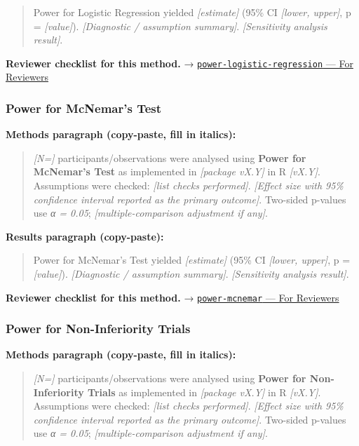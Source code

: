 \documentclass[
]{article}
\begin{document}
\begin{quote}
Power for Logistic Regression yielded \emph{{[}estimate{]}} (95\% CI
\emph{{[}lower, upper{]}}, p = \emph{{[}value{]}}). \emph{{[}Diagnostic
/ assumption summary{]}}. \emph{{[}Sensitivity analysis result{]}}.
\end{quote}

\textbf{Reviewer checklist for this method.} →
\href{../chapters/05-power/power-logistic-regression.Rmd\#for-reviewers}{\texttt{power-logistic-regression}
--- For Reviewers}

\subsubsection{Power for McNemar's Test}\label{power-for-mcnemars-test}

\textbf{Methods paragraph (copy-paste, fill in italics):}

\begin{quote}
\emph{{[}N={]}} participants/observations were analysed using
\textbf{Power for McNemar's Test} as implemented in \emph{{[}package
vX.Y{]}} in R \emph{{[}vX.Y{]}}. Assumptions were checked: \emph{{[}list
checks performed{]}}. \emph{{[}Effect size with 95\% confidence interval
reported as the primary outcome{]}}. Two-sided p-values use \emph{α =
0.05}; \emph{{[}multiple-comparison adjustment if any{]}}.
\end{quote}

\textbf{Results paragraph (copy-paste):}

\begin{quote}
Power for McNemar's Test yielded \emph{{[}estimate{]}} (95\% CI
\emph{{[}lower, upper{]}}, p = \emph{{[}value{]}}). \emph{{[}Diagnostic
/ assumption summary{]}}. \emph{{[}Sensitivity analysis result{]}}.
\end{quote}

\textbf{Reviewer checklist for this method.} →
\href{../chapters/05-power/power-mcnemar.Rmd\#for-reviewers}{\texttt{power-mcnemar}
--- For Reviewers}

\subsubsection{Power for Non-Inferiority
Trials}\label{power-for-non-inferiority-trials}

\textbf{Methods paragraph (copy-paste, fill in italics):}

\begin{quote}
\emph{{[}N={]}} participants/observations were analysed using
\textbf{Power for Non-Inferiority Trials} as implemented in
\emph{{[}package vX.Y{]}} in R \emph{{[}vX.Y{]}}. Assumptions were
checked: \emph{{[}list checks performed{]}}. \emph{{[}Effect size with
95\% confidence interval reported as the primary outcome{]}}. Two-sided
p-values use \emph{α = 0.05}; \emph{{[}multiple-comparison adjustment if
any{]}}.
\end{quote}
\end{document}
